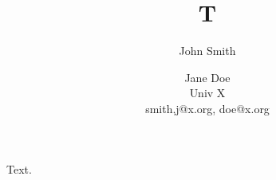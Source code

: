 \documentclass{article}
\title{T}\author{John Smith \and Jane Doe\\ Univ X\\ smith,j@x.org, doe@x.org}
\begin{document}
\maketitle
Text.
\end{document}
